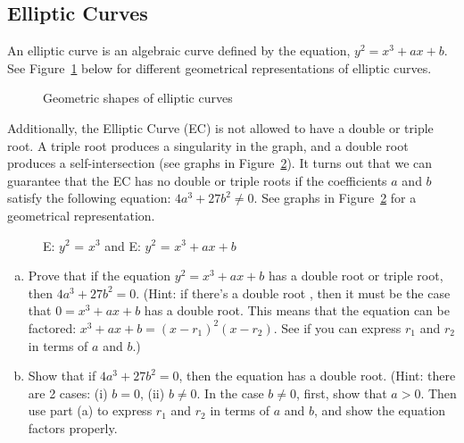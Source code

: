 \subsection{Elliptic Curves}
An elliptic curve is an algebraic curve defined by the equation, $y^2 = x^3 + ax + b$.  See Figure~\ref{fig:DH:DHKE_5} below for different geometrical representations of elliptic  curves.  
\begin{figure}[H]
	  \caption{\label{fig:DH:DHKE_5}  Geometric shapes of elliptic curves }
\end{figure}
Additionally, the Elliptic Curve (EC) is not allowed to have a double or triple root.  A triple root produces a singularity in the graph, and a double root produces a self-intersection (see graphs in Figure~\ref{fig:DH:DHKE_10}).  It turns out that we can guarantee that the EC has no double or triple roots if the coefficients $a$ and $b$ satisfy the following equation: $4a^3 + 27b^2 \neq 0$.  See graphs in Figure~\ref{fig:DH:DHKE_10} for a geometrical representation.
\begin{figure}[H]
	  \caption{\label{fig:DH:DHKE_10} E: $ y^2$ = $x^3$ and E: $ y^2$ = $x^3+ax+b$ }
\end{figure}
\begin{exercise}{}
		\begin{enumerate}[(a)] 
	\item  Prove that if the equation $y^2 = x^3 + ax + b$ has a double root or triple root, then $4a^3+27b^2=0$. (Hint:  if there's a double root , then it must be the case that $0 = x^3 + ax + b$ has a double root. This means that the equation can be factored:  $x^3 + ax+b = (x-r_1)^2(x-r_2)$.  See if you can express $r_1$ and $r_2$ in terms of $a$ and $b$.)\\
	\item Show that if $4a^3 + 27b ^2=0$, then the equation has a double root.  (Hint: there are 2 cases: (i) $b=0$, (ii) $b \neq 0$. In the case $b \neq 0$, first, show that $a > 0$.  Then use part (a) to express $r_1$ and $r_2$ in terms of $a$ and $b$, and show the equation factors properly.
\end {enumerate} 
\end{exercise}

